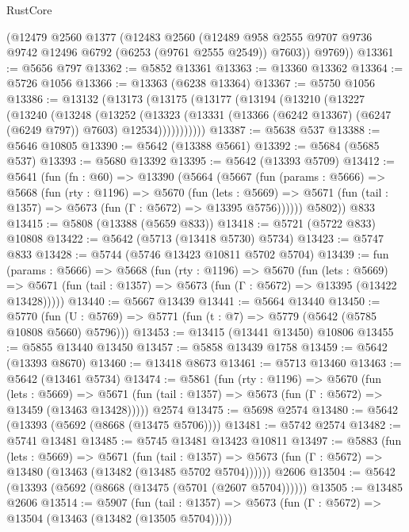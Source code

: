 \begin{lexlean}{RustCore}
\begin{coremodule}
      (@12479
        @2560
        @1377
        (@12483
          @2560
          (@12489 @958 @2555 @9707 @9736 @9742 @12496 @6792 (@6253 (@9761 @2555 @2549)) @7603))
        @9769))
@13361 := @5656 @797
@13362 := @5852 @13361
@13363 := @13360 @13362
@13364 := @5726 @1056
@13366 := @13363 (@6238 @13364)
@13367 := @5750 @1056
@13386 := @13132
    (@13173
      (@13175
        (@13177
          (@13194
            (@13210
              (@13227
                (@13240
                  (@13248
                    (@13252
                      (@13323
                        (@13331 (@13366 (@6242 @13367) (@6247 (@6249 @797)) @7603) @12534)))))))))))
@13387 := @5638 @537
@13388 := @5646 @10805
@13390 := @5642 (@13388 @5661)
@13392 := @5684 (@5685 @537)
@13393 := @5680 @13392
@13395 := @5642 (@13393 @5709)
@13412 := @5641
    (fun (fn : @60) =>
    @13390
      (@5664
        (@5667
          (fun (params : @5666) =>
          @5668
            (fun (rty : @1196) =>
            @5670
              (fun (lets : @5669) =>
              @5671 (fun (tail : @1357) => @5673 (fun (Γ : @5672) => @13395 @5756))))))
        @5802))
    @833
@13415 := @5808 (@13388 (@5659 @833))
@13418 := @5721 (@5722 @833) @10808
@13422 := @5642 (@5713 (@13418 @5730) @5734)
@13423 := @5747 @833
@13428 := @5744 (@5746 @13423 @10811 @5702 @5704)
@13439 := fun (params : @5666) =>
  @5668
    (fun (rty : @1196) =>
    @5670
      (fun (lets : @5669) =>
      @5671 (fun (tail : @1357) => @5673 (fun (Γ : @5672) => @13395 (@13422 @13428)))))
@13440 := @5667 @13439
@13441 := @5664 @13440
@13450 := @5770
    (fun (U : @5769) => @5771 (fun (t : @7) => @5779 (@5642 (@5785 @10808 @5660) @5796)))
@13453 := @13415 (@13441 @13450) @10806
@13455 := @5855 @13440 @13450
@13457 := @5858 @13439 @1758
@13459 := @5642 (@13393 @8670)
@13460 := @13418 @8673
@13461 := @5713 @13460
@13463 := @5642 (@13461 @5734)
@13474 := @5861
    (fun (rty : @1196) =>
    @5670
      (fun (lets : @5669) =>
      @5671 (fun (tail : @1357) => @5673 (fun (Γ : @5672) => @13459 (@13463 @13428)))))
    @2574
@13475 := @5698 @2574
@13480 := @5642 (@13393 (@5692 (@8668 (@13475 @5706))))
@13481 := @5742 @2574
@13482 := @5741 @13481
@13485 := @5745 @13481 @13423 @10811
@13497 := @5883
    (fun (lets : @5669) =>
    @5671
      (fun (tail : @1357) =>
      @5673 (fun (Γ : @5672) => @13480 (@13463 (@13482 (@13485 @5702 @5704))))))
    @2606
@13504 := @5642 (@13393 (@5692 (@8668 (@13475 (@5701 (@2607 @5704))))))
@13505 := @13485 @2606
@13514 := @5907
    (fun (tail : @1357) => @5673 (fun (Γ : @5672) => @13504 (@13463 (@13482 (@13505 @5704)))))

\end{coremodule}
\end{lexlean}
